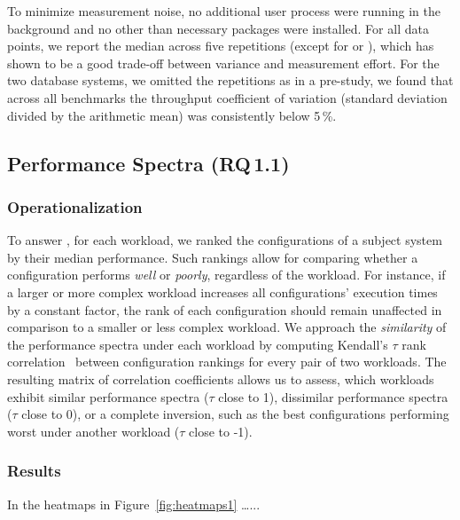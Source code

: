To minimize measurement noise, no additional user process were running in the background and no other than necessary packages were installed.
For all data points, we report the median across five repetitions (except for \hsqldb or \htwo), which has shown to be a good trade-off between variance and measurement effort. For the two database systems, we omitted the repetitions as in a pre-study, we found that across all benchmarks the throughput coefficient of variation (standard deviation divided by the arithmetic mean) was consistently below 5\,\%.

\subsection{Performance Spectra (RQ\,1.1)}\label{sec:performance_spectra}
\subsubsection{Operationalization}
To answer , for each workload, we ranked the configurations of a subject system by their median performance. Such rankings allow for comparing whether a configuration performs \emph{well} or \emph{poorly}, regardless of the workload. For instance, if a larger or more complex workload increases all configurations' execution times by a constant factor, the rank of each configuration should remain unaffected in comparison to a smaller or less complex workload.
We approach the \emph{similarity} of the performance spectra under each workload by computing Kendall's $\tau$ rank correlation~\cite{kendall1938new} between configuration rankings for every pair of two workloads. The resulting matrix of correlation coefficients allows us to assess, which workloads exhibit similar performance spectra ($\tau$ close to 1), dissimilar performance spectra ($\tau$ close to 0), or a complete inversion, such as the best configurations performing worst under another workload ($\tau$ close to -1).

\subsubsection{Results}
In the heatmaps in Figure~\ref{fig:heatmaps1} \ldots...
\begin{figure*}
	\begin{subfigure}{0.33\textwidth}
		\subcaption{\kanzi}
	\end{subfigure}
	\begin{subfigure}{0.33\textwidth}
		\subcaption{\htwo}
	\end{subfigure}
	\begin{subfigure}{0.33\textwidth}
		\subcaption{\batik}
	\end{subfigure}
	\caption{Similarity of performance spectra across workloads, clustered by Kendall's $\tau$ rank correlation coefficient.}
	\label{fig:heatmaps1}
\end{figure*}

